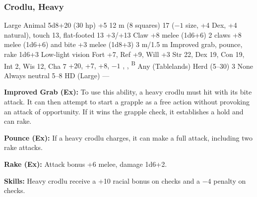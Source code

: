 \subsubsection{Crodlu, Heavy}
\begin{MonsterStats}
{Large Animal}
{5d8+20 (30 hp)}
{+5}
{12 m (8 squares)}
{17 ($-1$ size, +4 Dex, +4 natural), touch 13, flat-footed 13}
{+3/+13}
{Claw +8 melee (1d6+6)}
{2 claws +8 melee (1d6+6) and bite +3 melee (1d8+3)}
{3 m/1.5 m}
{Improved grab, pounce, rake 1d6+3}
{Low-light vision}
{Fort +7, Ref +9, Will +3}
{Str 22, Dex 19, Con 19, Int 2, Wis 12, Cha 7}
{ +20,  +7,  +8,  $-1$}
{, , \textsuperscript{B}}
{Any (Tablelands)}
{Herd (5--30)}
{3}
{None}
{Always neutral}
{5--8 HD (Large)}
{---}
\end{MonsterStats}

\textbf{Improved Grab (Ex):} To use this ability, a heavy crodlu must hit with its bite attack. It can then attempt to start a grapple as a free action without provoking an attack of opportunity. If it wins the grapple check, it establishes a hold and can rake.

\textbf{Pounce (Ex):} If a heavy crodlu charges, it can make a full attack, including two rake attacks.

\textbf{Rake (Ex):} Attack bonus +6 melee, damage 1d6+2.

\textbf{Skills:} Heavy crodlu receive a +10 racial bonus on  checks and a $-4$ penalty on  checks.
